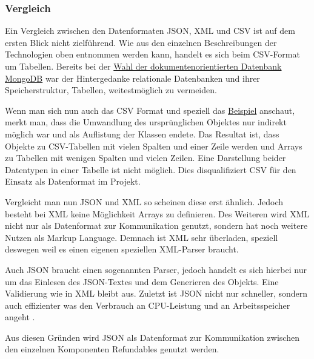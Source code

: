 		\subsubsection{Vergleich}
		Ein Vergleich zwischen den Datenformaten JSON, XML und CSV ist auf dem ersten Blick nicht zielführend. Wie aus den einzelnen Beschreibungen der Technologien oben entnommen werden kann, handelt es sich beim CSV-Format um Tabellen. Bereits bei der \hyperref[sec:db]{Wahl der dokumentenorientierten Datenbank MongoDB} war der Hintergedanke relationale Datenbanken und ihrer Speicherstruktur, Tabellen, weitestmöglich zu vermeiden. 
		
		Wenn man sich nun auch das CSV Format und speziell das \hyperref[code:csv]{Beispiel} anschaut, merkt man, dass die Umwandlung des ursprünglichen Objektes nur indirekt möglich war und als Auflistung der Klassen endete. Das Resultat ist, dass Objekte zu CSV-Tabellen mit vielen Spalten und einer Zeile werden und Arrays zu Tabellen mit wenigen Spalten und vielen Zeilen. Eine Darstellung beider Datentypen in einer Tabelle ist nicht möglich. Dies disqualifiziert CSV für den Einsatz als Datenformat im Projekt.
		
		Vergleicht man nun JSON und XML so scheinen diese erst ähnlich. Jedoch besteht bei XML keine Möglichkeit Arrays zu definieren. Des Weiteren wird XML nicht nur als Datenformat zur Kommunikation genutzt, sondern hat noch weitere Nutzen als Markup Language. Demnach ist XML sehr überladen, speziell deswegen weil es einen eigenen speziellen XML-Parser braucht.
		
		Auch JSON braucht einen sogenannten Parser, jedoch handelt es sich hierbei nur um das Einlesen des JSON-Textes und dem Generieren des Objekts. Eine Validierung wie in XML bleibt aus. Zuletzt ist JSON nicht nur schneller, sondern auch effizienter was den Verbrauch an CPU-Leistung und an Arbeitsspeicher angeht \cite{Nurseitov}.
		
		Aus diesen Gründen wird JSON als Datenformat zur Kommunikation zwischen den einzelnen Komponenten Refundables genutzt werden.